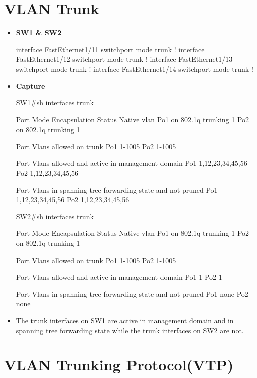\documentclass[10pt]{article}
\begin{document}
\section{VLAN Trunk}
\begin{itemize}
\item {\bf SW1 \& SW2}
\begin{verbatim*}
interface FastEthernet1/11
 switchport mode trunk
!
interface FastEthernet1/12
 switchport mode trunk
!
interface FastEthernet1/13
 switchport mode trunk
!
interface FastEthernet1/14
 switchport mode trunk
!
\end{verbatim*}
\item {\bf Capture}
\begin{verbatim*}
SW1#sh interfaces trunk

Port      Mode         Encapsulation  Status        Native vlan
Po1       on           802.1q         trunking      1
Po2       on           802.1q         trunking      1

Port      Vlans allowed on trunk
Po1       1-1005
Po2       1-1005

Port      Vlans allowed and active in management domain
Po1       1,12,23,34,45,56
Po2       1,12,23,34,45,56

Port      Vlans in spanning tree forwarding state and not pruned
Po1       1,12,23,34,45,56
Po2       1,12,23,34,45,56

SW2#sh interfaces trunk

Port      Mode         Encapsulation  Status        Native vlan
Po1       on           802.1q         trunking      1
Po2       on           802.1q         trunking      1

Port      Vlans allowed on trunk
Po1       1-1005
Po2       1-1005

Port      Vlans allowed and active in management domain
Po1       1
Po2       1

Port      Vlans in spanning tree forwarding state and not pruned
Po1       none
Po2       none
\end{verbatim*}
\item The trunk interfaces on SW1 are active in management domain and in spanning tree forwarding state while the trunk interfaces on SW2 are not.
\end{itemize}
\section{VLAN Trunking Protocol(VTP)}
\end{document}

